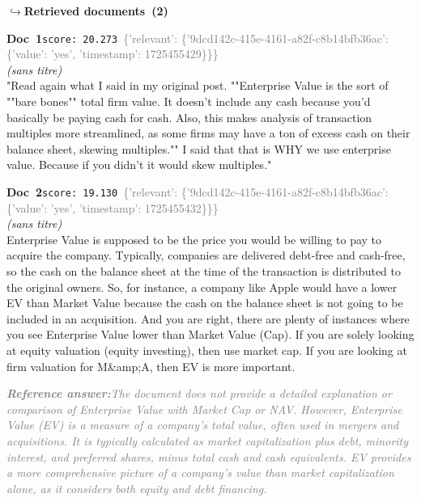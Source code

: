 \documentclass[a4paper,11pt]{article}
\begin{document}
\noindent\hfill{\footnotesize\textcolor{doccolor}{\textbf{$\hookrightarrow$\enspace Retrieved documents~(2)}}}
\begin{docenv}
{\footnotesize\textcolor{doccolor}{\textbf{Doc~1}}}\hfill{\tiny\texttt{score:~20.273}}\ {\tiny\textcolor{gray}{\{'relevant': \{'9dcd142c-415e-4161-a82f-c8b14bfb36ac': \{'value': 'yes', 'timestamp': 1725455429\}\}\}}}\\[3pt]
{\small\textit{(sans titre)}}\\[2pt]
\vspace{2pt}
{\footnotesize 
"Read again what I said in my original post.  ""Enterprise Value is the sort of ""bare bones"" total firm value. It doesn't include any cash because you'd basically be paying cash for cash. Also, this makes analysis of transaction multiples more streamlined, as some firms may have a ton of excess cash on their balance sheet, skewing multiples.""  I said that that is WHY we use enterprise value. Because if you didn't it would skew multiples."}
\end{docenv}
\begin{docenv}
{\footnotesize\textcolor{doccolor}{\textbf{Doc~2}}}\hfill{\tiny\texttt{score:~19.130}}\ {\tiny\textcolor{gray}{\{'relevant': \{'9dcd142c-415e-4161-a82f-c8b14bfb36ac': \{'value': 'yes', 'timestamp': 1725455432\}\}\}}}\\[3pt]
{\small\textit{(sans titre)}}\\[2pt]
\vspace{2pt}
{\footnotesize 
Enterprise Value is supposed to be the price you would be willing to pay to acquire the company. Typically, companies are delivered debt-free and cash-free, so the cash on the balance sheet at the time of the transaction is distributed to the original owners. So, for instance, a company like Apple would have a lower EV than Market Value because the cash on the balance sheet is not going to be included in an acquisition.  And you are right, there are plenty of instances where you see Enterprise Value lower than Market Value (Cap).   If you are solely looking at equity valuation (equity investing), then use market cap. If you are looking at firm valuation for M\&amp;A, then EV is more important.}
\end{docenv}
\begin{refanswerenv}
{\footnotesize\textit{\textcolor{gray}{\textbf{Reference answer:}\enspace The document does not provide a detailed explanation or comparison of Enterprise Value with Market Cap or NAV. However, Enterprise Value (EV) is a measure of a company's total value, often used in mergers and acquisitions. It is typically calculated as market capitalization plus debt, minority interest, and preferred shares, minus total cash and cash equivalents. EV provides a more comprehensive picture of a company's value than market capitalization alone, as it considers both equity and debt financing.}}}
\end{refanswerenv}
\end{document}

